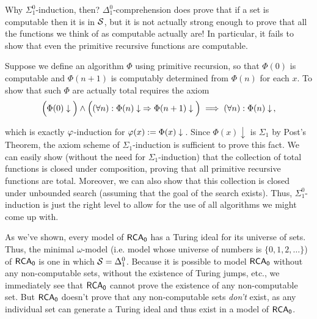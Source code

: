 \documentclass{amsart}
\begin{document}
	Why $\Sigma_1^0$-induction, then? $\Delta_1^0$-comprehension does prove that if a set is computable then it is in $\mathcal{S}$, but it is not actually strong enough to prove that all the functions we think of as computable actually are! In particular, it fails to show that even the primitive recursive functions are computable.
	
	\indent Suppose we define an algorithm $\Phi$ using primitive recursion, so that $\Phi(0)$ is computable and $\Phi(n+1)$ is computably determined from $\Phi(n)$ for each $x$. To show that such $\Phi$ are actually total requires the axiom
	$$
	\Big(\Phi(0)\downarrow \Big) \wedge \Big( (\forall n): \Phi(n)\downarrow \; \Rightarrow \Phi(n+1)\downarrow\Big) \implies (\forall n): \Phi(n)\downarrow \,,
	$$
	\begin{samepage}which is exactly $\varphi$-induction for $\varphi(x):=\Phi(x)\downarrow\,$. Since $\Phi(x)\downarrow$ is $\Sigma_1$ by Post's Theorem, the axiom scheme of $\Sigma_1$-induction is sufficient to prove this fact. We can easily show (without the need for $\Sigma_1$-induction) that the collection of total functions is closed under composition, proving that all primitive recursive functions are total. Moreover, we can also show that this collection is closed under unbounded search (assuming that the goal of the search exists). Thus, $\Sigma_1^0$-induction is just the right level to allow for the use of all algorithms we might come up with.\end{samepage}
	
	As we've shown, every model of $\operatorname{\sf{RCA_0}}$ has a Turing ideal for its universe of sets. Thus, the minimal $\omega$-model (i.e. model whose universe of numbers is $\{0,1,2,\dots\}$) of $\operatorname{\sf{RCA_0}}$ is one in which $\mathcal{S}=\Delta_1^0$. Because it is possible to model $\operatorname{\sf{RCA_0}}$ without any non-computable sets, without the existence of Turing jumps, etc., we immediately see that $\operatorname{\sf{RCA_0}}$ cannot prove the existence of any non-computable set. But $\operatorname{\sf{RCA_0}}$ doesn't prove that any non-computable sets \textit{don't} exist, as any individual set can generate a Turing ideal and thus exist in a model of $\operatorname{\sf{RCA_0}}$.\\
	
	
	
	
\end{document}
